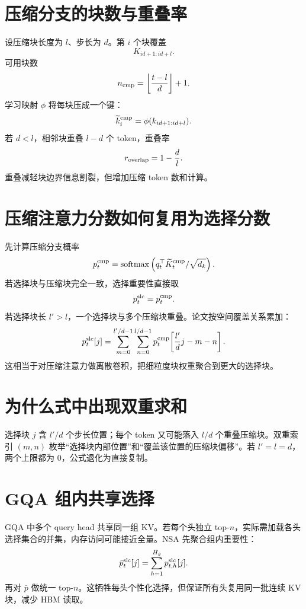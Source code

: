\documentclass[UTF8,12pt,a4paper,fontset=none]{ctexart}
\numberwithin{equation}{section}
\newcommand{\softmax}{\operatorname{softmax}}
\begin{document}
\section{压缩分支的块数与重叠率}
设压缩块长度为 $l$、步长为 $d$。第 $i$ 个块覆盖
\begin{equation}
 K_{id+1:id+l}.
\end{equation}
可用块数
\begin{equation}
 n_{\rm cmp}=\left\lfloor\frac{t-l}{d}\right\rfloor+1.
\end{equation}
学习映射 $\phi$ 将每块压成一个键：
\begin{equation}
 \widetilde k_i^{\rm cmp}=\phi(k_{id+1:id+l}).
\end{equation}
若 $d<l$，相邻块重叠 $l-d$ 个 token，重叠率
\begin{equation}
 r_{\rm overlap}=1-\frac{d}{l}.
\end{equation}
重叠减轻块边界信息割裂，但增加压缩 token 数和计算。

\section{压缩注意力分数如何复用为选择分数}
先计算压缩分支概率
\begin{equation}
 p_t^{\rm cmp}=\softmax\left(q_t^\top\widetilde K_t^{\rm cmp}/\sqrt{d_k}\right).
\end{equation}
若选择块与压缩块完全一致，选择重要性直接取
\begin{equation}
 p_t^{\rm slc}=p_t^{\rm cmp}.
\end{equation}
若选择块长 $l'>l$，一个选择块与多个压缩块重叠。论文按空间覆盖关系累加：
\begin{equation}
 p_t^{\rm slc}[j]
 =\sum_{m=0}^{l'/d-1}\sum_{n=0}^{l/d-1}
 p_t^{\rm cmp}\!\left[\frac{l'}d j-m-n\right].
\end{equation}
这相当于对压缩注意力做离散卷积，把细粒度块权重聚合到更大的选择块。

\section{为什么式中出现双重求和}
选择块 $j$ 含 $l'/d$ 个步长位置；每个 token 又可能落入 $l/d$ 个重叠压缩块。双重索引 $(m,n)$ 枚举“选择块内部位置”和“覆盖该位置的压缩块偏移”。若 $l'=l=d$，两个上限都为 0，公式退化为直接复制。

\section{GQA 组内共享选择}
GQA 中多个 query head 共享同一组 KV。若每个头独立 top-$n$，实际需加载各头选择集合的并集，内存访问可能接近全量。NSA 先聚合组内重要性：
\begin{equation}
 \bar p_t^{\rm slc}[j]=\sum_{h=1}^{H_g}p_{t,h}^{\rm slc}[j].
\end{equation}
再对 $\bar p$ 做统一 top-$n$。这牺牲每头个性化选择，但保证所有头复用同一批连续 KV 块，减少 HBM 读取。
\end{document}
